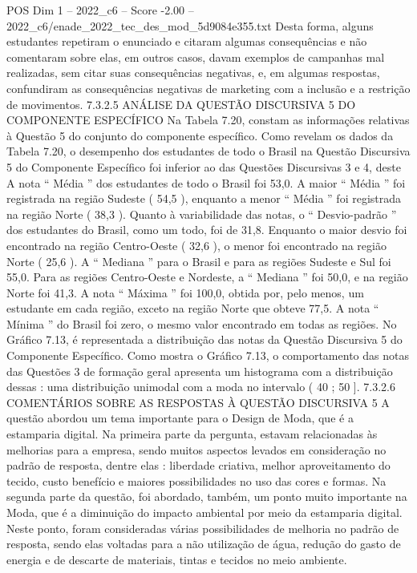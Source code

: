 \begin{textsample}{POS Dim 1 – 2022\_c6 – Score -2.00 – 2022\_c6/enade\_2022\_tec\_des\_mod\_5d9084e355.txt}
Desta forma, alguns estudantes repetiram o enunciado e citaram algumas consequências e não comentaram sobre elas, em outros casos, davam exemplos de campanhas mal realizadas, sem citar suas consequências negativas, e, em algumas respostas, confundiram as consequências negativas de marketing com a inclusão e a restrição de movimentos. 7.3.2.5 ANÁLISE DA QUESTÃO DISCURSIVA 5 DO COMPONENTE ESPECÍFICO Na Tabela 7.20, constam as informações relativas à Questão 5 do conjunto do componente específico.
Como revelam os dados da Tabela 7.20, o desempenho dos estudantes de todo o Brasil na Questão Discursiva 5 do Componente Específico foi inferior ao das Questões Discursivas 3 e 4, deste A nota “ Média ” dos estudantes de todo o Brasil foi 53,0.
A maior “ Média ” foi registrada na região Sudeste ( 54,5 ), enquanto a menor “ Média ” foi registrada na região Norte ( 38,3 ).
Quanto à variabilidade das notas, o “ Desvio-padrão ” dos estudantes do Brasil, como um todo, foi de 31,8.
Enquanto o maior desvio foi encontrado na região Centro-Oeste ( 32,6 ), o menor foi encontrado na região Norte ( 25,6 ).
A “ Mediana ” para o Brasil e para as regiões Sudeste e Sul foi 55,0.
Para as regiões Centro-Oeste e Nordeste, a “ Mediana ” foi 50,0, e na região Norte foi 41,3.
A nota “ Máxima ” foi 100,0, obtida por, pelo menos, um estudante em cada região, exceto na região Norte que obteve 77,5.
A nota “ Mínima ” do Brasil foi zero, o mesmo valor encontrado em todas as regiões.
No Gráfico 7.13, é representada a distribuição das notas da Questão Discursiva 5 do Componente Específico.
Como mostra o Gráfico 7.13, o comportamento das notas das Questões 3 de formação geral apresenta um histograma com a distribuição dessas : uma distribuição unimodal com a moda no intervalo ( 40 ; 50 ]. 7.3.2.6 COMENTÁRIOS SOBRE AS RESPOSTAS À QUESTÃO DISCURSIVA 5 A questão abordou um tema importante para o Design de Moda, que é a estamparia digital.
Na primeira parte da pergunta, estavam relacionadas às melhorias para a empresa, sendo muitos aspectos levados em consideração no padrão de resposta, dentre elas : liberdade criativa, melhor aproveitamento do tecido, custo benefício e maiores possibilidades no uso das cores e formas.
Na segunda parte da questão, foi abordado, também, um ponto muito importante na Moda, que é a diminuição do impacto ambiental por meio da estamparia digital.
Neste ponto, foram consideradas várias possibilidades de melhoria no padrão de resposta, sendo elas voltadas para a não utilização de água, redução do gasto de energia e de descarte de materiais, tintas e tecidos no meio ambiente.

\end{textsample}
